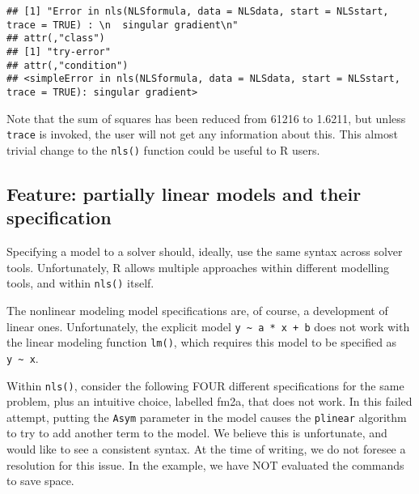 \documentclass[
]{article}
\begin{document}
\begin{verbatim}
## [1] "Error in nls(NLSformula, data = NLSdata, start = NLSstart, trace = TRUE) : \n  singular gradient\n"
## attr(,"class")
## [1] "try-error"
## attr(,"condition")
## <simpleError in nls(NLSformula, data = NLSdata, start = NLSstart, trace = TRUE): singular gradient>
\end{verbatim}

Note that the sum of squares has been reduced from 61216 to 1.6211, but
unless \texttt{trace} is invoked, the user will not get any information
about this. This almost trivial change to the \texttt{nls()} function
could be useful to R users.

\hypertarget{feature-partially-linear-models-and-their-specification}{%
\subsection{Feature: partially linear models and their
specification}\label{feature-partially-linear-models-and-their-specification}}

Specifying a model to a solver should, ideally, use the same syntax
across solver tools. Unfortunately, R allows multiple approaches within
different modelling tools, and within \texttt{nls()} itself.

The nonlinear modeling model specifications are, of course, a
development of linear ones. Unfortunately, the explicit model
\texttt{y\ \textasciitilde{}\ a\ *\ x\ +\ b} does not work with the
linear modeling function \texttt{lm()}, which requires this model to be
specified as \texttt{y\ \textasciitilde{}\ x}.

Within \texttt{nls()}, consider the following FOUR different
specifications for the same problem, plus an intuitive choice, labelled
fm2a, that does not work. In this failed attempt, putting the
\texttt{Asym} parameter in the model causes the \texttt{plinear}
algorithm to try to add another term to the model. We believe this is
unfortunate, and would like to see a consistent syntax. At the time of
writing, we do not foresee a resolution for this issue. In the example,
we have NOT evaluated the commands to save space.
\end{document}
